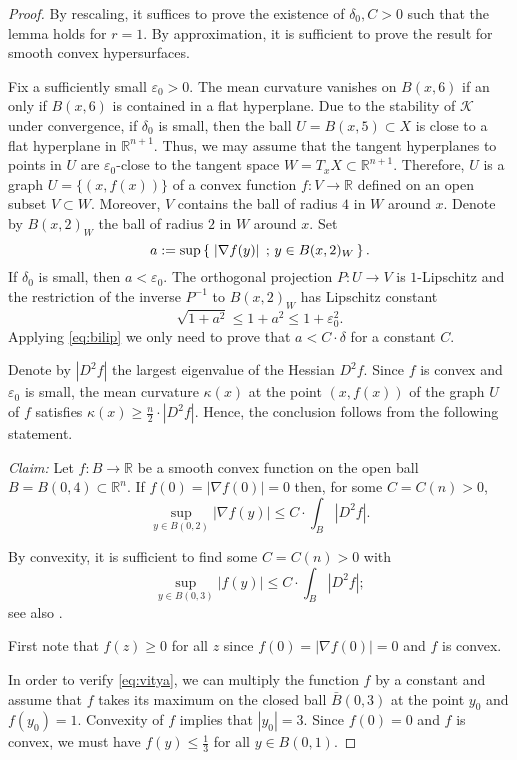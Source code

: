 \documentclass[12pt,leqno,intlimits]{amsart}
\numberwithin{equation}{section}
\theoremstyle{definition}
\theoremstyle{remark}
\newcommand{\R}{\mathbb{R}}
\def\:{\colon}
\newcommand*{\set}[2]{\left\{\,\left.{#1}\vphantom{#2}\,\right.;\,{#2}\,\right\}}
\begin{document}
\begin{proof}
By rescaling, it suffices to prove the existence of $\delta _0, C>0$ such that the lemma holds for $r=1$.
By approximation, it is sufficient to prove the result for smooth convex hypersurfaces.

Fix a sufficiently small $\varepsilon _0>0$.
The mean curvature vanishes on $B (x,6)$ if an only if $B(x,6)$ is contained in a flat hyperplane.
Due to the stability of $\mathcal K$ under convergence, if $\delta_0$ is small, then
the ball $U=B (x,{5}) \subset X$ is close to a flat hyperplane in $\R^{n+1}$.
Thus, we may assume that the tangent hyperplanes to points in $U$ are $\varepsilon_0$-close to the tangent
space $W =T_xX \subset \R^{n+1}$. Therefore, $U$ is a graph $U=\{(x,f(x))\}$ of a convex function $f\:V\to \R$ defined on an open subset $V\subset W$. Moreover, $V$ contains the ball of radius $4$ in $W$ around $x$.
Denote by $B(x,2)_W$ the ball of radius $2$ in $W$ around $x$.
Set
$$a :=\sup \set{|\nabla f (y)|}{y\in B(x,2)_W}.$$
If $\delta_0$ is small, then $a<\varepsilon_0$.
The orthogonal projection $P\:U\to V$ is $1$-Lipschitz and the restriction of the inverse $P^{-1}$ to $B(x,2)_W$ has Lipschitz constant $$\sqrt {1+ a^2} \leq 1+a^2 \leq 1+\varepsilon_0 ^2.$$
Applying \eqref{eq:bilip} we only need to prove that $a < C \cdot \delta $ for a constant $C$.

Denote by $|D^2f|$ the largest eigenvalue of the Hessian $D^2f$.
Since $f$ is convex and $\varepsilon _0$ is small, the mean curvature $\mathcal \kappa (x)$ at the point $(x,f(x))$ of the graph $U$ of $f$ satisfies $\kappa (x) \geq \frac n 2 \cdot |D^2 f|$. Hence, the conclusion follows from the following statement.

\emph{Claim:} Let $f:B \to \R$ be a smooth convex function on the open ball $B=B (0,4)\subset \R^n$.
If $f(0)=|\nabla f(0)| =0$ then, for some $C=C(n)>0$,
$$\sup_{y\in B (0,2)} |\nabla f (y)| \leq C\cdot \int _{B} |D^2f|.$$

By convexity, it is sufficient to find some $C=C(n)>0$ with
\begin{equation} \label{eq:vitya}
\sup _{y\in B (0,3) }| f(y)| \leq C \cdot \int _{B} |D^2f|;
\end{equation}
see also \cite[Theorem 6.7]{Evans}.

First note that $f(z)\ge 0$ for all $z$ since  $f(0)=|\nabla f(0)| =0$ and $f$ is convex.

In order to verify \eqref{eq:vitya}, we can multiply the function $f$ by a constant and assume that
$f$ takes its maximum on the closed ball $\bar B (0,3)$ at the point $y_0$ and $f(y_0)=1$.
Convexity of $f$ implies that $|y_0|=3$.
Since $f(0)=0$ and $f$ is convex, we must have $f(y)\leq \frac 1 3$ for all $y\in B(0,1)$.


\end{proof}
\end{document}
